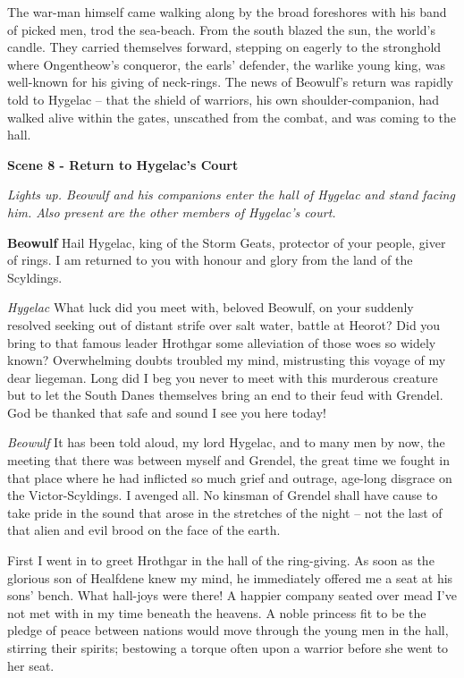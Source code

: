 \documentclass[a4paper]{article}
\begin{document}
{The war-man himself came walking along
by the broad foreshores with his band of picked men,
trod the sea-beach. From the south blazed
the sun, the world’s candle. They carried themselves forward,
stepping on eagerly to the stronghold where
Ongentheow’s conqueror, the earls’ defender,
the warlike young king, was well-known for his
giving of neck-rings. The news of Beowulf’s
return was rapidly told to Hygelac
– that the shield of warriors, his own shoulder-companion,
had walked alive within the gates,
unscathed from the combat, and was coming to the hall.

\centerline{\textbf{Scene 8 - Return to Hygelac's Court}}
\centerline{\textit{Lights up. Beowulf and his companions enter the hall of Hygelac and stand facing him. Also present are the other members of Hygelac's court.}}

\textbf{Beowulf} Hail Hygelac,
king of the Storm Geats, 
protector of your people, giver of rings.
I am returned to you with honour and glory
from the land of the Scyldings.

\textit{Hygelac} What luck did you meet with, beloved Beowulf,
on your suddenly resolved seeking out
of distant strife over salt water,
battle at Heorot? Did you bring to that famous
leader Hrothgar some alleviation
of those woes so widely known? Overwhelming doubts
troubled my mind, mistrusting this voyage
of my dear liegeman. Long did I beg you
never to meet with this murderous creature
but to let the South Danes themselves bring an end
to their feud with Grendel. God be thanked
that safe and sound I see you here today!

\textit{Beowulf} It has been told aloud, my lord Hygelac,
and to many men by now, the meeting that there was
between myself and Grendel, the great time
we fought in that place where he had inflicted so much
grief and outrage, age-long disgrace
on the Victor-Scyldings. I avenged all.
No kinsman of Grendel shall have cause to take pride
in the sound that arose in the stretches of the night
– not the last of that alien and evil brood
on the face of the earth.

First I went in
to greet Hrothgar in the hall of the ring-giving.
As soon as the glorious son of Healfdene
knew my mind, he immediately
offered me a seat at his sons’ bench.
What hall-joys were there! A happier company
seated over mead I’ve not met with in my time
beneath the heavens. A noble princess
fit to be the pledge of peace between nations
would move through the young men in the hall,
stirring their spirits; bestowing a torque
often upon a warrior before she went to her seat.

}
\end{document}
